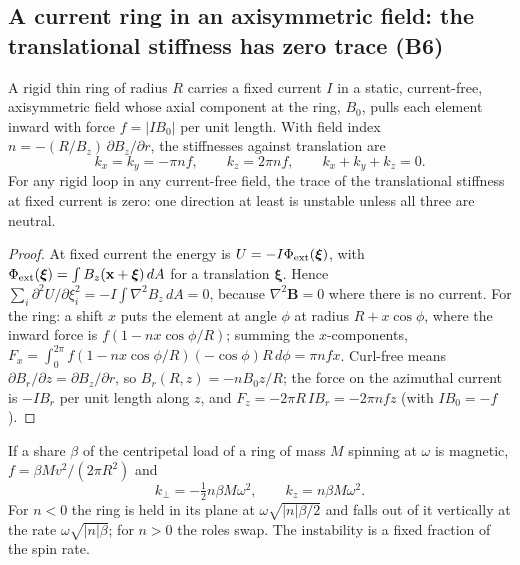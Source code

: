\subsection{A current ring in an axisymmetric field: the translational stiffness has zero trace (B6)}
\begin{theorem}\label{thm:ring}
A rigid thin ring of radius $R$ carries a fixed current $I$ in a static, current-free, axisymmetric field whose axial component at the ring,
$B_0$, pulls each element inward with force $f=|IB_0|$ per unit length. With field index $n=-(R/B_z)\,\partial B_z/\partial r$, the stiffnesses
against translation are
\begin{equation}
k_x=k_y=-\pi nf,\qquad k_z=2\pi nf,\qquad k_x+k_y+k_z=0 .\label{eq:ringk}
\end{equation}
For any rigid loop in any current-free field, the trace of the translational stiffness at fixed current is zero: one direction at least is
unstable unless all three are neutral.
\end{theorem}
\begin{proof}
At fixed current the energy is $U=-I\Phi_{\rm ext}(\boldsymbol\xi)$, with $\Phi_{\rm ext}(\boldsymbol\xi)=\int B_z(\mathbf x+\boldsymbol\xi)\,dA$ for a
translation $\boldsymbol\xi$. Hence $\sum_i\partial^2U/\partial\xi_i^2=-I\int\nabla^2B_z\,dA=0$, because $\nabla^2\mathbf B=0$ where there is no
current. For the ring: a shift $x$ puts the element at angle $\phi$ at radius $R+x\cos\phi$, where the inward force is $f(1-nx\cos\phi/R)$;
summing the $x$-components, $F_x=\int_0^{2\pi}f(1-nx\cos\phi/R)(-\cos\phi)R\,d\phi=\pi nfx$. Curl-free means $\partial B_r/\partial z=\partial
B_z/\partial r$, so $B_r(R,z)=-nB_0z/R$; the force on the azimuthal current is $-IB_r$ per unit length along $z$, and
$F_z=-2\pi R\,IB_r=-2\pi nfz$ (with $IB_0=-f$).
\end{proof}
\begin{corollary}[rates]\label{cor:rates}
If a share $\beta$ of the centripetal load of a ring of mass $M$ spinning at $\omega$ is magnetic, $f=\beta Mv^2/(2\pi R^2)$ and
\begin{equation}
k_\perp=-\tfrac12 n\beta M\omega^2,\qquad k_z=n\beta M\omega^2 .\label{eq:ringrates}
\end{equation}
For $n<0$ the ring is held in its plane at $\omega\sqrt{|n|\beta/2}$ and falls out of it vertically at the rate $\omega\sqrt{|n|\beta}$; for $n>0$
the roles swap. The instability is a fixed fraction of the spin rate.
\end{corollary}
